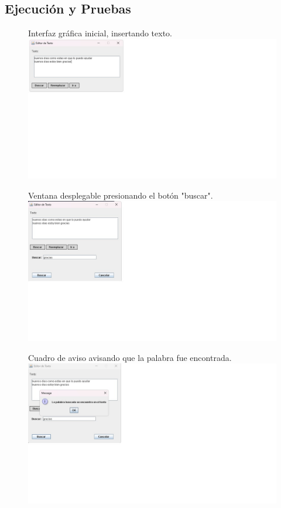 \documentclass{article}
\begin{document}
	\subsection{Ejecución y Pruebas}	
	\begin{figure}[H]
        \centering
		Interfaz gráfica inicial, insertando texto.
        \includegraphics[width=2.5\textwidth,keepaspectratio]{img/GUI.jpg}
    \end{figure}
	\begin{figure}[H]
        \centering
		Ventana desplegable presionando el botón "buscar".
        \includegraphics[width=2.5\textwidth,keepaspectratio]{img/buscar1.jpg}
    \end{figure}
	\begin{figure}[H]
        \centering
		Cuadro de aviso avisando que la palabra fue encontrada.
        \includegraphics[width=2.5\textwidth,keepaspectratio]{img/buscar2.jpg}
    \end{figure}
\end{document}
